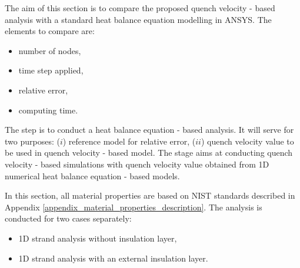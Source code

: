 
The aim of this section is to compare the proposed quench velocity - based analysis with a standard heat balance equation modelling in ANSYS. The elements to compare are: 
\begin{itemize}
    \item number of nodes,
    \item time step applied,
    \item relative error, 
    \item computing time.
\end{itemize}

The  step is to conduct a heat balance equation - based analysis. It will serve for two purposes: ($i$) reference model for relative error, ($ii$) quench velocity value to be used in quench velocity - based model. The  stage aims at conducting quench velocity - based simulations with quench velocity value obtained from 1D numerical heat balance equation - based models. 

In this section, all material properties are based on NIST standards described in Appendix \ref{appendix_material_properties_description}. The analysis is conducted for two cases separately: 
\begin{itemize}
    \item 1D strand analysis without insulation layer,
    \item 1D strand analysis with an external insulation layer.
\end{itemize}


